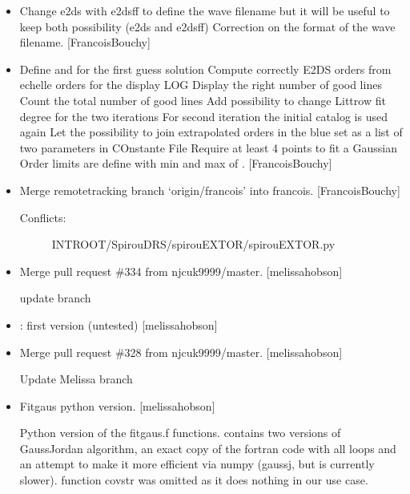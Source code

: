 \documentclass[a4paper,10pt,english]{report}
\begin{document}
\begin{itemize}
\item {} 
Change e2ds with e2dsff to define the wave filename but it will be
useful to keep both possibility (e2ds and e2dsff) Correction on the
format of the wave filename. {[}FrancoisBouchy{]}

\item {} 
Define  and  for the first guess solution Compute
correctly E2DS orders from echelle orders for the display LOG Display
the right number of good lines Count the total number of good lines
Add possibility to change Littrow fit degree for the two iterations
For second iteration the initial catalog is used again Let the
possibility to join extrapolated orders in the blue  set
as a list of two parameters in COnstante File Require at least 4
points to fit a Gaussian Order limits are define with min and max of
. {[}FrancoisBouchy{]}

\item {} 
Merge remote\sphinxhyphen{}tracking branch ‘origin/francois’ into francois.
{[}FrancoisBouchy{]}
\begin{description}
\item[{Conflicts:}] \leavevmode
INTROOT/SpirouDRS/spirouEXTOR/spirouEXTOR.py

\end{description}

\item {} 
Merge pull request \#334 from njcuk9999/master. {[}melissa\sphinxhyphen{}hobson{]}

update branch

\item {} 
: first version (untested) {[}melissa\sphinxhyphen{}hobson{]}

\item {} 
Merge pull request \#328 from njcuk9999/master. {[}melissa\sphinxhyphen{}hobson{]}

Update Melissa branch

\item {} 
Fitgaus \sphinxhyphen{} python version. {[}melissa\sphinxhyphen{}hobson{]}

Python version of the fitgaus.f functions.
\sphinxhyphen{} contains two versions of Gauss\sphinxhyphen{}Jordan algorithm, an exact copy of the fortran code with all loops  and an attempt to make it more efficient via numpy (gaussj, but is currently slower).
\sphinxhyphen{} function covstr was omitted as it does nothing in our use case.


\end{itemize}
\end{document}
